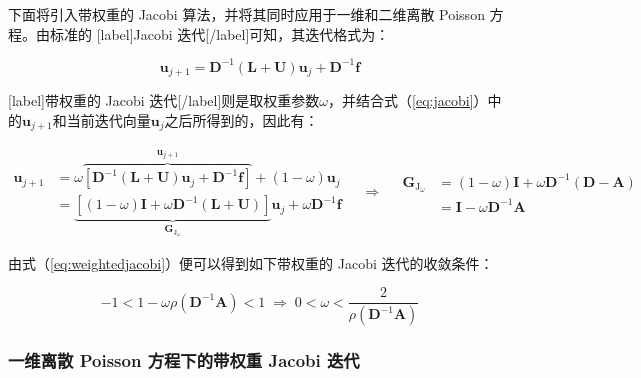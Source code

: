 \documentclass[12pt, UTF8, nofonts]{ctexart}
\begin{document}
下面将引入带权重的 Jacobi 算法，并将其同时应用于一维和二维离散 Poisson 方程。由标准的 [label]Jacobi 迭代[/label]可知，其迭代格式为：

\begin{equation}
  \label{eq:jacobi}
  \boldsymbol{u}_{j+1} = \boldsymbol{D}^{-1} (\boldsymbol{L}+\boldsymbol{U}) \boldsymbol{u}_j + \boldsymbol{D}^{-1}\boldsymbol{f}
\end{equation}

[label]带权重的 Jacobi 迭代[/label]则是取权重参数$\omega$，并结合式（\ref{eq:jacobi}）中的$\boldsymbol{u}_{j+1}$和当前迭代向量$\boldsymbol{u}_j$之后所得到的，因此有：

\begin{equation}
  \label{eq:weightedjacobi}
  \begin{aligned}
    \boldsymbol{u}_{j+1} &= \omega \overbrace{\left[\boldsymbol{D}^{-1} (\boldsymbol{L}+\boldsymbol{U}) \boldsymbol{u}_{j} + \boldsymbol{D}^{-1}\boldsymbol{f}\right]}^{\boldsymbol{u}_{j+1}} + (1-\omega)\boldsymbol{u}_j \\
    &= \underbrace{\left[(1-\omega)\boldsymbol{I} + \omega\boldsymbol{D}^{-1}(\boldsymbol{L}+\boldsymbol{U})\right]}_{\boldsymbol{G}_{\mathrm{J}_\omega}} \boldsymbol{u}_{j} + \omega\boldsymbol{D}^{-1}\boldsymbol{f}
  \end{aligned} \quad\Rightarrow\quad
  \begin{aligned}
    \boldsymbol{G}_{\mathrm{J}_\omega} &= (1-\omega)\boldsymbol{I} + \omega\boldsymbol{D}^{-1}(\boldsymbol{D}-\boldsymbol{A}) \\
    &= \boldsymbol{I} - \omega\boldsymbol{D}^{-1}\boldsymbol{A}
  \end{aligned}
\end{equation}

由式（\ref{eq:weightedjacobi}）便可以得到如下带权重的 Jacobi 迭代的收敛条件：

\begin{equation}
  \label{eq:wjitercon}
  -1 < 1 - \omega\rho(\boldsymbol{D}^{-1}\boldsymbol{A}) < 1 \;\Rightarrow\;
  0 < \omega < \dfrac{2}{\rho(\boldsymbol{D}^{-1}\boldsymbol{A})}
\end{equation}



\subsubsection*{一维离散 Poisson 方程下的带权重 Jacobi 迭代}
\end{document}
